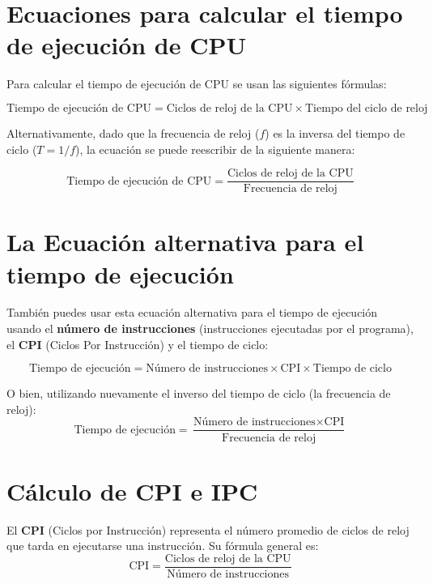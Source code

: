 \documentclass[12pt, a4paper]{article}
\begin{document}
	\section{Ecuaciones para calcular el tiempo de ejecución de CPU}
	
	Para calcular el tiempo de ejecución de CPU se usan las siguientes fórmulas:
	
	\begin{equation}
		\text{Tiempo de ejecución de CPU} = \text{Ciclos de reloj de la CPU} \times \text{Tiempo del ciclo de reloj}
	\end{equation}
	
	Alternativamente, dado que la frecuencia de reloj ($f$) es la inversa del tiempo de ciclo ($T = 1/f$), la ecuación se puede reescribir de la siguiente manera:
	
	\begin{equation}
		\text{Tiempo de ejecución de CPU} = \frac{\text{Ciclos de reloj de la CPU}}{\text{Frecuencia de reloj}}
	\end{equation}
	
	\section{La Ecuación alternativa para el tiempo de ejecución}
	
	También puedes usar esta ecuación alternativa para el tiempo de ejecución usando el \textbf{número de instrucciones} (instrucciones ejecutadas por el programa), el \textbf{CPI} (Ciclos Por Instrucción) y el tiempo de ciclo:
	
	\begin{equation}
		\text{Tiempo de ejecución} = \text{Número de instrucciones} \times \text{CPI} \times \text{Tiempo de ciclo}
	\end{equation}
	
	O bien, utilizando nuevamente el inverso del tiempo de ciclo (la frecuencia de reloj):
	\begin{equation}
		\text{Tiempo de ejecución} = \frac{\text{Número de instrucciones} \times \text{CPI}}{\text{Frecuencia de reloj}}
	\end{equation}
	
	\section{Cálculo de CPI e IPC}
	
	El \textbf{CPI} (Ciclos por Instrucción) representa el número promedio de ciclos de reloj que tarda en ejecutarse una instrucción. Su fórmula general es:
	\begin{equation}
		\text{CPI} = \frac{\text{Ciclos de reloj de la CPU}}{\text{Número de instrucciones}}
	\end{equation}
	
\end{document}
